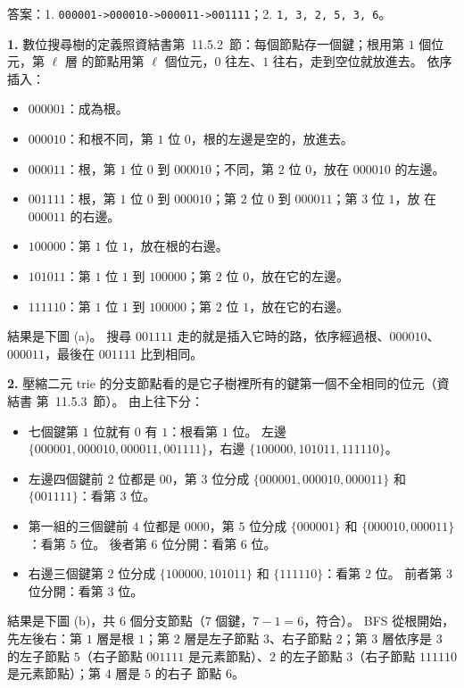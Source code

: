 \begin{pastsoln}
答案：1. \texttt{000001->000010->000011->001111}；2. \texttt{1, 3, 2, 5, 3, 6}。

\textbf{1.} 數位搜尋樹的定義照資結書第~11.5.2~節：每個節點存一個鍵；根用第 $1$ 個位元，第 $\ell$ 層
的節點用第 $\ell$ 個位元，$0$ 往左、$1$ 往右，走到空位就放進去。 依序插入：
\begin{itemize}
\item $000001$：成為根。
\item $000010$：和根不同，第 $1$ 位 $0$，根的左邊是空的，放進去。
\item $000011$：根，第 $1$ 位 $0$ 到 $000010$；不同，第 $2$ 位 $0$，放在 $000010$ 的左邊。
\item $001111$：根，第 $1$ 位 $0$ 到 $000010$；第 $2$ 位 $0$ 到 $000011$；第 $3$ 位 $1$，放
在 $000011$ 的右邊。
\item $100000$：第 $1$ 位 $1$，放在根的右邊。
\item $101011$：第 $1$ 位 $1$ 到 $100000$；第 $2$ 位 $0$，放在它的左邊。
\item $111110$：第 $1$ 位 $1$ 到 $100000$；第 $2$ 位 $1$，放在它的右邊。
\end{itemize}
結果是下圖 (a)。 搜尋 $001111$ 走的就是插入它時的路，依序經過根、$000010$、$000011$，最後在
$001111$ 比到相同。

\textbf{2.} 壓縮二元 trie 的分支節點看的是它子樹裡所有的鍵第一個不全相同的位元（資結書
第~11.5.3~節）。 由上往下分：
\begin{itemize}
\item 七個鍵第 $1$ 位就有 $0$ 有 $1$：根看第 $1$ 位。 左邊 $\{000001, 000010, 000011,
001111\}$，右邊 $\{100000, 101011, 111110\}$。
\item 左邊四個鍵前 $2$ 位都是 $00$，第 $3$ 位分成 $\{000001, 000010, 000011\}$ 和
$\{001111\}$：看第 $3$ 位。
\item 第一組的三個鍵前 $4$ 位都是 $0000$，第 $5$ 位分成 $\{000001\}$ 和
$\{000010, 000011\}$：看第 $5$ 位。 後者第 $6$ 位分開：看第 $6$ 位。
\item 右邊三個鍵第 $2$ 位分成 $\{100000, 101011\}$ 和 $\{111110\}$：看第 $2$ 位。 前者第
$3$ 位分開：看第 $3$ 位。
\end{itemize}
結果是下圖 (b)，共 $6$ 個分支節點（$7$ 個鍵，$7 - 1 = 6$，符合）。 BFS 從根開始，先左後右：第 $1$
層是根 $1$；第 $2$ 層是左子節點 $3$、右子節點 $2$；第 $3$ 層依序是 $3$ 的左子節點 $5$（右子節點
$001111$ 是元素節點）、$2$ 的左子節點 $3$（右子節點 $111110$ 是元素節點）；第 $4$ 層是 $5$ 的右子
節點 $6$。


\end{pastsoln}
